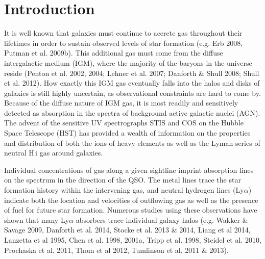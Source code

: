 \documentclass[iop]{emulateapj-rtx4}
\begin{document}
%


\section{Introduction}

It is well known that galaxies must continue to accrete gas throughout their lifetimes in order to sustain observed levels of star formation (e.g. Erb 2008, Putman et al. 2009b). This additional gas must come from the diffuse intergalactic medium (IGM), where the majority of the baryons in the universe reside (Penton et al. 2002, 2004; Lehner et al. 2007; Danforth $\&$ Shull 2008; Shull et al. 2012). How exactly this IGM gas eventually falls into the halos and disks of galaxies is still highly uncertain, as observational constraints are hard to come by. Because of the diffuse nature of IGM gas, it is most readily and sensitively detected as absorption in the spectra of background active galactic nuclei (AGN). The advent of the sensitive UV spectrographs STIS and COS on the Hubble Space Telescope (HST) has provided a wealth of information on the properties and distribution of both the ions of heavy elements as well as the Lyman series of neutral H\,{\sc i} gas around galaxies. 

Individual concentrations of gas along a given sightline imprint absorption lines on the spectrum in the direction of the QSO. The metal lines trace the star formation history within the intervening gas, and neutral hydrogen lines (Ly$\alpha$) indicate both the location and velocities of outflowing gas as well as the presence of fuel for future star formation. Numerous studies using these observations have shown that many Ly$\alpha$ absorbers trace individual galaxy halos (e.g. Wakker $\&$ Savage 2009, Danforth et al. 2014, Stocke et al. 2013 $\&$ 2014, Liang et al 2014, Lanzetta et al 1995, Chen et al. 1998, 2001a, Tripp et al. 1998, Steidel et al. 2010, Prochaska et al. 2011, Thom et al 2012, Tumlinson et al. 2011 $\&$ 2013). 


\end{document}
